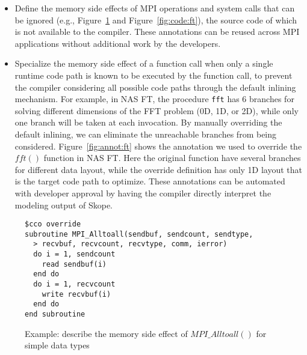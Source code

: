 \begin{itemize}
\item Define the memory side effects of MPI operations and system calls that can be ignored (e.g., Figure~\ref{fig:annot:a2a} and Figure~\ref{fig:code:ft}), the source code of which is not available to the compiler. These annotations can be reused across MPI applications without additional work by the developers.

\item Specialize the memory side effect of a function call when only a single runtime code path is known to be executed by the function call,  to prevent the compiler considering all possible code paths through the default inlining mechanism.  For
  example, in NAS FT, the procedure \texttt{fft} has 6 branches for
  solving different dimensions of the FFT problem (0D, 1D, or 2D),
  while only one branch will be taken at each invocation.  By manually
  overriding the default inlining, we can eliminate the unreachable
  branches from being considered.
  Figure~\ref{fig:annot:ft} shows the annotation we used to override the $fft()$
function in NAS FT.  Here the original function have several branches for
different data layout, while the override definition has only 1D
layout that is the target code path to optimize. These annotations can be automated with developer approval by having the compiler directly interpret the modeling output of Skope.



\end{itemize}


\begin{figure}[h]
{\scriptsize
\begin{verbatim}
$cco override
subroutine MPI_Alltoall(sendbuf, sendcount, sendtype,
  > recvbuf, recvcount, recvtype, comm, ierror)
  do i = 1, sendcount
    read sendbuf(i)
  end do
  do i = 1, recvcount
    write recvbuf(i)
  end do
end subroutine
\end{verbatim}
}
\caption{Example: describe the memory side effect of $MPI\_Alltoall()$ for simple data types}
\label{fig:annot:a2a}
\vspace{-.1in}
\end{figure}

